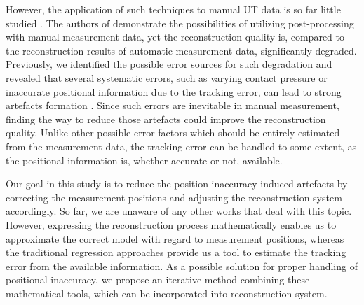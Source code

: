 However, the application of such techniques to manual UT data is so far little studied \cite{Mayer16SAFTwithSmallData} \cite{Krieg18SHMNDT}. The authors of \cite{Krieg18SHMNDT} demonstrate the possibilities of utilizing post-processing with manual measurement data, yet the reconstruction quality is, compared to the reconstruction results of automatic measurement data, significantly degraded. Previously, we identified the possible error sources for such degradation and revealed that several systematic errors, such as varying contact pressure or inaccurate positional information due to the tracking error, can lead to strong artefacts formation \cite{Krieg19IUS}. Since such errors are inevitable in manual measurement, finding the way to reduce those artefacts could improve the reconstruction quality. Unlike other possible error factors which should be entirely estimated from the measurement data, the tracking error can be handled to some extent, as the positional information is, whether accurate or not, available. \par

Our goal in this study is to reduce the position-inaccuracy induced artefacts by correcting the measurement positions and adjusting the reconstruction system accordingly. So far, we are unaware of any other works that deal with this topic. However, expressing the reconstruction process mathematically enables us to approximate the correct model with regard to measurement positions, whereas the traditional regression approaches provide us a tool to estimate the tracking error from the available information. As a possible solution for proper handling of positional inaccuracy, we propose an iterative method combining these mathematical tools, which can be incorporated into reconstruction system. \par
%
